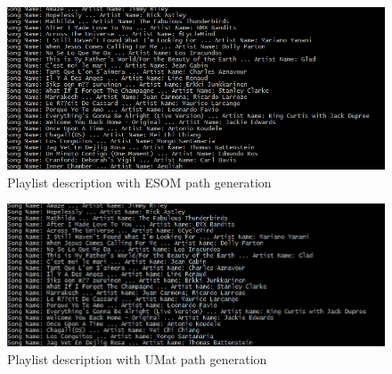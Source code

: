 \begin{figure}[h!]
    \centering
    \includegraphics[width=\textwidth]{figures/ESOMSongs.PNG}
    \caption{Playlist description with ESOM path generation}
    \label{fig:esomres}
\end{figure}

\begin{figure}[h!]
    \centering
    \includegraphics[width=\textwidth]{figures/UMatSongs.PNG}
    \caption{Playlist description with UMat path generation}
    \label{fig:umatres}
\end{figure}
